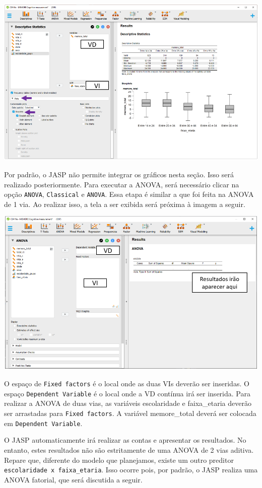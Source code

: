 \documentclass[
]{book}
\begin{document}
\includegraphics{./img/cap_anova_two_way_plot1.png}

Por padrão, o JASP não permite integrar os gráficos nesta seção. Isso será realizado posteriormente. Para executar a ANOVA, será necessário clicar na opção \texttt{ANOVA}, \texttt{Classical} e \texttt{ANOVA}. Essa etapa é similar a que foi feita na ANOVA de 1 via. Ao realizar isso, a tela a ser exibida será próxima à imagem a seguir.

\includegraphics{./img/cap_anova_two_way_interface.png}

O espaço de \texttt{Fixed\ factors} é o local onde as duas VIs deverão ser inseridas. O espaço \texttt{Dependent\ Variable} é o local onde a VD contínua irá ser inserida. Para realizar a ANOVA de duas vias, as variáveis escolaridade e faixa\_etaria deverão ser arrastadas para \texttt{Fixed\ factors}. A variável memore\_total deverá ser colocada em \texttt{Dependent\ Variable}.

O JASP automaticamente irá realizar as contas e apresentar os resultados. No entanto, estes resultados não são estritamente de uma ANOVA de 2 vias aditiva. Repare que, diferente do modelo que planejamos, existe um outro preditor \texttt{escolaridade\ x\ faixa\_etaria}. Isso ocorre pois, por padrão, o JASP realiza uma ANOVA fatorial, que será discutida a seguir.
\end{document}
